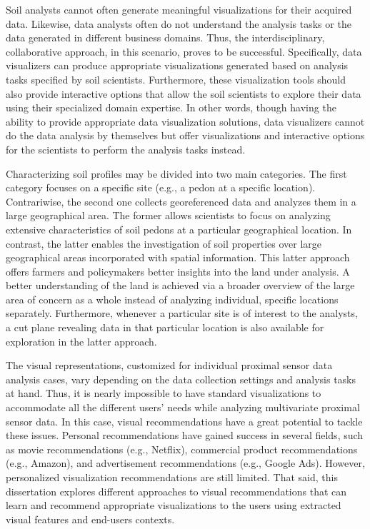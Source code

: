 Soil analysts cannot often generate meaningful visualizations for their acquired data. Likewise, data analysts often do not understand the analysis tasks or the data generated in different business domains. Thus, the interdisciplinary, collaborative approach, in this scenario, proves to be successful. Specifically, data visualizers can produce appropriate visualizations generated based on analysis tasks specified by soil scientists. Furthermore, these visualization tools should also provide interactive options that allow the soil scientists to explore their data using their specialized domain expertise. In other words, though having the ability to provide appropriate data visualization solutions, data visualizers cannot do the data analysis by themselves but offer visualizations and interactive options for the scientists to perform the analysis tasks instead.

Characterizing soil profiles may be divided into two main categories. The first category focuses on a specific site (e.g., a pedon at a specific location). Contrariwise, the second one collects georeferenced data and analyzes them in a large geographical area. The former allows scientists to focus on analyzing extensive characteristics of soil pedons at a particular geographical location. In contrast, the latter enables the investigation of soil properties over large geographical areas incorporated with spatial information. This latter approach offers farmers and policymakers better insights into the land under analysis. A better understanding of the land is achieved via a broader overview of the large area of concern as a whole instead of analyzing individual, specific locations separately. Furthermore, whenever a particular site is of interest to the analysts, a cut plane revealing data in that particular location is also available for exploration in the latter approach.

The visual representations, customized for individual proximal sensor data analysis cases, vary depending on the data collection settings and analysis tasks at hand. Thus, it is nearly impossible to have standard visualizations to accommodate all the different users' needs while analyzing multivariate proximal sensor data. In this case, visual recommendations have a great potential to tackle these issues. Personal recommendations have gained success in several fields, such as movie recommendations (e.g., Netflix), commercial product recommendations (e.g., Amazon), and advertisement recommendations (e.g., Google Ads). However, personalized visualization recommendations are still limited. That said, this dissertation explores different approaches to visual recommendations that can learn and recommend appropriate visualizations to the users using extracted visual features and end-users contexts.

